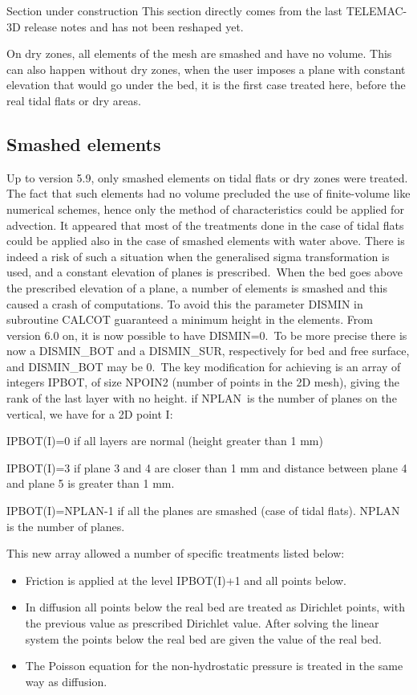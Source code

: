 \begin{WarningBlock}{Section under construction}
This section directly comes from the last TELEMAC-3D release notes and has not been
reshaped yet.
\end{WarningBlock}

On dry zones, all elements of the mesh are smashed and have no volume. This
can also happen without dry zones, when the user imposes a plane with constant
elevation that would go under the bed, it is the first case treated here,
before the real tidal flats or dry areas.

\subsection{Smashed elements}

Up to version 5.9, only smashed elements on tidal flats or dry zones were
treated. The fact that such elements had no volume precluded the use of
finite-volume like numerical schemes, hence only the method of characteristics
could be applied for advection. It appeared that most of the treatments done
in the case of tidal flats could be applied also in the case of smashed
elements with water above. There is indeed a risk of such a situation when the
generalised sigma transformation is used, and a constant elevation of planes
is prescribed.\ When the bed goes above the prescribed elevation of a
plane, a number of elements is smashed and this caused a crash of
computations. To avoid this the parameter DISMIN in subroutine CALCOT
guaranteed a minimum height in the elements. From version 6.0 on, it is now
possible to have DISMIN=0.\ To be more precise there is now a DISMIN\_BOT and
a DISMIN\_SUR, respectively for bed and free surface, and DISMIN\_BOT may
be 0.\ The key modification for achieving is an array of integers IPBOT, of
size NPOIN2 (number of points in the 2D mesh), giving the rank of the last
layer with no height. if NPLAN\ is the number of planes on the vertical, we
have for a 2D point I:

IPBOT(I)=0 if all layers are normal (height greater than 1 mm)

IPBOT(I)=3 if plane 3 and 4 are closer than 1 mm and distance between plane 4
and plane 5 is greater than 1 mm.

IPBOT(I)=NPLAN-1 if all the planes are smashed (case of tidal flats). NPLAN is
the number of planes.

This new array allowed a number of specific treatments listed below:

\begin{itemize}
\item Friction is applied at the level IPBOT(I)+1 and all points below.

\item In diffusion all points below the real bed are treated as Dirichlet
points, with the previous value as prescribed Dirichlet value. After solving
the linear system the points below the real bed are given the value of the
real bed.

\item The Poisson equation for the non-hydrostatic pressure is treated in the
same way as diffusion.
\end{itemize}

